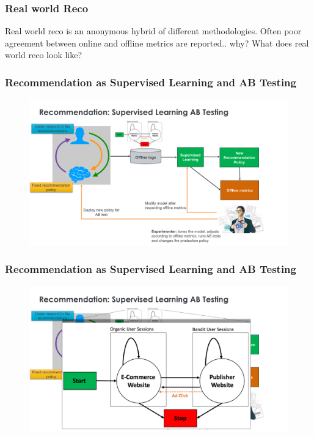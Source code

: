 \begin{frame}
  \frametitle{Real world Reco}

Real world reco is an anonymous hybrid of different methodologies.
Often poor agreement between online and offline metrics are
reported..  \pause why? \pause What does real world reco look like?

\end{frame}

  
\begin{frame}
  \frametitle{Recommendation as Supervised Learning and AB Testing}
 
 
   \begin{figure}[h!]
     \includegraphics[scale=0.3]{images/recoasabtesting0.png}
       \centering
       \label{motex1}
   \end{figure}
     
 \end{frame}

      


\begin{frame}
\frametitle{Recommendation as Supervised Learning and AB Testing}


 \begin{figure}[h!]
   \includegraphics[scale=0.3]{images/recoasabtesting.png}
     \centering
     \label{motex1}
 \end{figure}
   
\end{frame}



